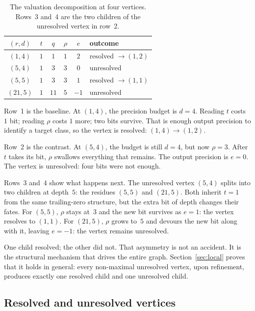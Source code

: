 \documentclass[11pt]{amsart}
\theoremstyle{definition}
\theoremstyle{remark}
\begin{document}
\begin{table}[htbp]
\centering
\renewcommand{\arraystretch}{1.15}
\begin{tabular}{cccccl}
\toprule
$(r,d)$ & $t$ & $q$ & $\rho$ & $e$ & outcome \\
\midrule
$(1,4)$ & $1$ & $1$ & $1$ & $2$ & resolved $\to(1,2)$ \\
$(5,4)$ & $1$ & $3$ & $3$ & $0$ & unresolved \\
$(5,5)$ & $1$ & $3$ & $3$ & $1$ & resolved $\to(1,1)$ \\
$(21,5)$ & $1$ & $11$ & $5$ & $-1$ & unresolved \\
\bottomrule
\end{tabular}
\smallskip
\caption{The valuation decomposition at four vertices.  Rows~3 and~4 are the two children of the unresolved vertex in row~2.}
\label{tab:examples}
\end{table}

Row~1 is the baseline.  At $(1,4)$, the precision budget is $d=4$.  Reading $t$ costs $1$ bit; reading $\rho$ costs $1$ more; two bits survive.  That is enough output precision to identify a target class, so the vertex is resolved: $(1,4)\to(1,2)$.

Row~2 is the contrast.  At $(5,4)$, the budget is still $d=4$, but now $\rho=3$.  After $t$ takes its bit, $\rho$ swallows everything that remains.  The output precision is $e=0$.  The vertex is unresolved: four bits were not enough.

Rows~3 and~4 show what happens next.  The unresolved vertex $(5,4)$ splits into two children at depth~$5$: the residues $(5,5)$ and $(21,5)$.  Both inherit $t=1$ from the same trailing-zero structure, but the extra bit of depth changes their fates.  For $(5,5)$, $\rho$ stays at~$3$ and the new bit survives as $e=1$: the vertex resolves to $(1,1)$.  For $(21,5)$, $\rho$ grows to~$5$ and devours the new bit along with it, leaving $e=-1$: the vertex remains unresolved.

One child resolved; the other did not.  That asymmetry is not an accident. It is the structural mechanism that drives the entire graph.  Section~\ref{sec:local} proves that it holds in general: every non-maximal unresolved vertex, upon refinement, produces exactly one resolved child and one unresolved child.

\subsection{Resolved and unresolved vertices}
\end{document}
